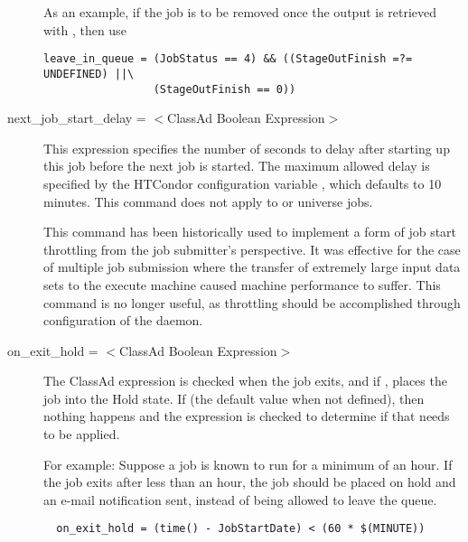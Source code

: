\begin{description}
As an example, if the job is to be removed once the output is retrieved
with , then use 
\footnotesize
\begin{verbatim}
leave_in_queue = (JobStatus == 4) && ((StageOutFinish =?= UNDEFINED) ||\
                 (StageOutFinish == 0))
\end{verbatim}
\normalsize


\label{condor-submit-next-job-start-delay}
\item[next\_job\_start\_delay = $<$ClassAd Boolean Expression$>$]
This expression specifies the number of seconds to delay after starting up
this job before the next job is started.  The maximum
allowed delay is specified by the HTCondor configuration variable
\Macro{MAX\_NEXT\_JOB\_START\_DELAY}, which defaults to 10 minutes.
This command does not apply to \SubmitCmdNI{scheduler}
or  universe jobs.

This command has been historically used to implement a form
of job start throttling from the job submitter's perspective.
It was effective for the case of multiple job submission where
the transfer of extremely large input data sets to the execute
machine caused machine performance to suffer.
This command is no longer useful, as throttling should be
accomplished through configuration of the  daemon.


\label{condor-submit-on-exit-hold}
\item[on\_exit\_hold = $<$ClassAd Boolean Expression$>$] 
The ClassAd expression is checked when the job exits, and if ,
places the job into the Hold state.
If  (the default value when not defined),
then nothing happens and the  expression is
checked to determine if that needs to be applied.

For example:
Suppose a job is known to run for a minimum of an hour.
If the job exits after less than an hour, the job should be placed on
hold and an e-mail notification sent,
instead of being allowed to leave the queue.

\footnotesize
\begin{verbatim}
  on_exit_hold = (time() - JobStartDate) < (60 * $(MINUTE))
\end{verbatim}
\normalsize


\end{description}
